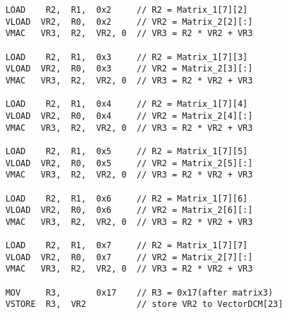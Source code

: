 \documentclass[UTF8]{ctexart}
\begin{document}
\begin{lstlisting}
    LOAD    R2,  R1,  0x2     // R2 = Matrix_1[7][2]
    VLOAD  VR2,  R0,  0x2     // VR2 = Matrix_2[2][:]
    VMAC   VR3,  R2,  VR2, 0  // VR3 = R2 * VR2 + VR3

    LOAD    R2,  R1,  0x3     // R2 = Matrix_1[7][3]
    VLOAD  VR2,  R0,  0x3     // VR2 = Matrix_2[3][:]
    VMAC   VR3,  R2,  VR2, 0  // VR3 = R2 * VR2 + VR3

    LOAD    R2,  R1,  0x4     // R2 = Matrix_1[7][4]
    VLOAD  VR2,  R0,  0x4     // VR2 = Matrix_2[4][:]
    VMAC   VR3,  R2,  VR2, 0  // VR3 = R2 * VR2 + VR3

    LOAD    R2,  R1,  0x5     // R2 = Matrix_1[7][5]
    VLOAD  VR2,  R0,  0x5     // VR2 = Matrix_2[5][:]
    VMAC   VR3,  R2,  VR2, 0  // VR3 = R2 * VR2 + VR3

    LOAD    R2,  R1,  0x6     // R2 = Matrix_1[7][6]
    VLOAD  VR2,  R0,  0x6     // VR2 = Matrix_2[6][:]
    VMAC   VR3,  R2,  VR2, 0  // VR3 = R2 * VR2 + VR3

    LOAD    R2,  R1,  0x7     // R2 = Matrix_1[7][7]
    VLOAD  VR2,  R0,  0x7     // VR2 = Matrix_2[7][:]
    VMAC   VR3,  R2,  VR2, 0  // VR3 = R2 * VR2 + VR3

    MOV     R3,       0x17    // R3 = 0x17(after matrix3)
    VSTORE  R3,  VR2          // store VR2 to VectorDCM[23]

\end{lstlisting}
\end{document}
